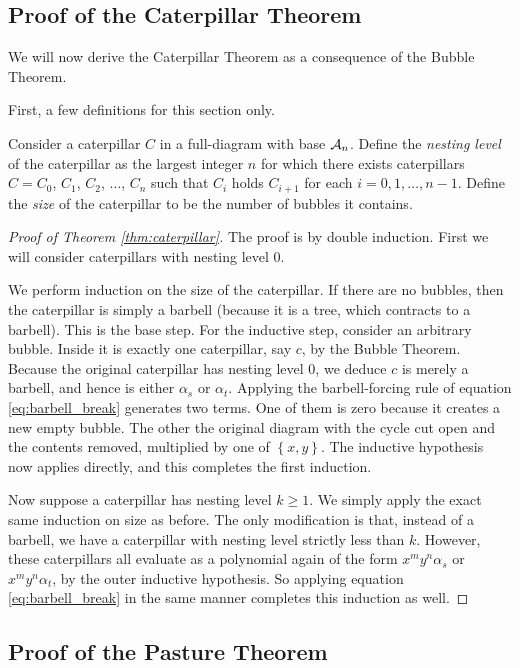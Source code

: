 \subsection{Proof of the Caterpillar Theorem}
We will now derive the Caterpillar Theorem as a consequence of the Bubble Theorem.  

First, a few definitions for this section only.
\begin{definition*}
	Consider a caterpillar $C$ in a full-diagram with base $\AA_n$.  Define the \emph{nesting level} of the caterpillar as the largest integer $n$ for which there exists caterpillars $C = C_0$, $C_1$, $C_2$, $\dots$, $C_n$ such that $C_i$ holds $C_{i+1}$ for each $i=0,1,\dots,n-1$.  Define the \emph{size} of the caterpillar to be the number of bubbles it contains.
\end{definition*}

\begin{proof}[Proof of Theorem \ref{thm:caterpillar}]
	The proof is by double induction.  First we will consider caterpillars with nesting level $0$.  

	We perform induction on the size of the caterpillar. 
	If there are no bubbles, then the caterpillar is simply a barbell (because it is a tree, which contracts to a barbell).
	This is the base step.
	For the inductive step, consider an arbitrary bubble.  Inside it is exactly one caterpillar, say $c$, by the Bubble Theorem.  Because the original caterpillar has nesting level $0$, we deduce $c$ is merely a barbell, and hence is either $\alpha_s$ or $\alpha_t$.
	Applying the barbell-forcing rule of equation \eqref{eq:barbell_break} generates two terms.  One of them is zero because it creates a new empty bubble. The other the original diagram with the cycle cut open and the contents removed, multiplied by one of $\left\{ x,y \right\}$.  The inductive hypothesis now applies directly, and this completes the first induction.

	Now suppose a caterpillar has nesting level $k \ge 1$.  We simply apply the exact same induction on size as before.  The only modification is that, instead of a barbell, we have a caterpillar with nesting level strictly less than $k$.  However, these caterpillars all evaluate as a polynomial again of the form $x^my^n \alpha_s$ or $x^my^n\alpha_t$, by the outer inductive hypothesis.  So applying equation \eqref{eq:barbell_break} in the same manner completes this induction as well.
\end{proof}

\subsection{Proof of the Pasture Theorem}


